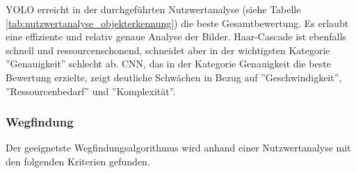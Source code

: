 \documentclass[../main.tex]{subfiles}
\begin{document}
\begin{table}[H]
    \caption{Nutzwertanalyse Objekterkennung}
    \label{tab:nutzwertanalyse_objekterkennung}
\end{table}

YOLO erreicht in der durchgeführten Nutzwertanalyse (siehe Tabelle \ref{tab:nutzwertanalyse_objekterkennung}) die beste Gesamtbewertung. Es erlaubt eine effiziente und relativ genaue Analyse der Bilder.
Haar-Cascade ist ebenfalls schnell und ressourcenschonend, schneidet aber in der wichtigsten Kategorie ''Genauigkeit'' schlecht ab.
CNN, das in der Kategorie Genauigkeit die beste Bewertung erzielte, zeigt deutliche Schwächen in Bezug auf ''Geschwindigkeit'', ''Ressourcenbedarf'' und ''Komplexität''.

\newpage

\subsubsection{Wegfindung}
\label{a3:Wegfindung}
Der geeignetste Wegfindungsalgorithmus wird anhand einer Nutzwertanalyse mit den folgenden Kriterien gefunden.
\end{document}
